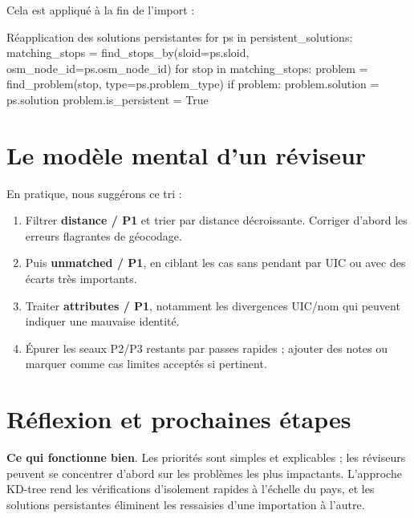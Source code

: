 \noindent Cela est appliqué à la fin de l'import :
\begin{codebox}[language=Python]{Réapplication des solutions persistantes}
for ps in persistent_solutions:
    matching_stops = find_stops_by(sloid=ps.sloid, osm_node_id=ps.osm_node_id)
    for stop in matching_stops:
        problem = find_problem(stop, type=ps.problem_type)
        if problem:
            problem.solution = ps.solution
            problem.is_persistent = True
\end{codebox}

\section{Le modèle mental d'un réviseur}
En pratique, nous suggérons ce tri :
\begin{enumerate}
  \item Filtrer \textbf{distance / P1} et trier par distance décroissante. Corriger d'abord les erreurs flagrantes de géocodage.
  \item Puis \textbf{unmatched / P1}, en ciblant les cas sans pendant par UIC ou avec des écarts très importants.
  \item Traiter \textbf{attributes / P1}, notamment les divergences UIC/nom qui peuvent indiquer une mauvaise identité.
  \item Épurer les seaux P2/P3 restants par passes rapides ; ajouter des notes ou marquer comme cas limites acceptés si pertinent.
\end{enumerate}

\section{Réflexion et prochaines étapes}
\textbf{Ce qui fonctionne bien}. Les priorités sont simples et explicables ; les réviseurs peuvent se concentrer d'abord sur les problèmes les plus impactants. L'approche KD-tree rend les vérifications d'isolement rapides à l'échelle du pays, et les solutions persistantes éliminent les ressaisies d'une importation à l'autre.

